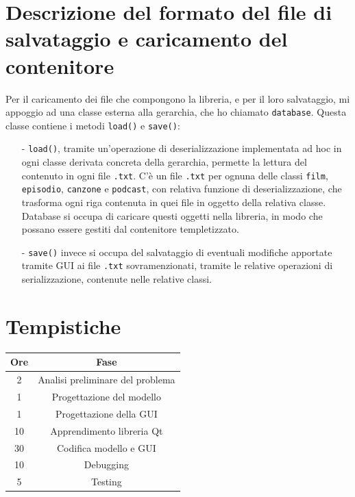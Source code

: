 \documentclass[a4paper,10pt]{article}
\begin{document}
\section{Descrizione del formato del file di salvataggio e caricamento del contenitore}
Per il caricamento dei file che compongono la libreria, e per il loro salvataggio, mi appoggio ad una classe esterna alla gerarchia, che ho chiamato \texttt{database}. Questa classe contiene i metodi \texttt{load()} e \texttt{save()}: 
\begin{enumerate}
\item[-] \texttt{load()}, tramite un'operazione di deserializzazione implementata ad hoc in ogni classe derivata concreta della gerarchia, permette la lettura del contenuto in ogni file \texttt{.txt}. C'è un file \texttt{.txt} per ognuna delle classi \texttt{film}, \texttt{episodio}, \texttt{canzone} e \texttt{podcast}, con relativa funzione di deserializzazione, che trasforma ogni riga contenuta in quei file in oggetto della relativa classe. Database si occupa di caricare questi oggetti nella libreria, in modo che possano essere gestiti dal contenitore templetizzato.
\item[-] \texttt{save()} invece si occupa del salvataggio di eventuali modifiche apportate tramite GUI ai file \texttt{.txt} sovramenzionati, tramite le relative operazioni di serializzazione, contenute nelle relative classi. 
\end{enumerate}

\section{Tempistiche}

\begin{center}
 \begin{tabular}{||c | c ||} 
 \hline
 \textbf{Ore} & \textbf{Fase}  \\ 
 \hline\hline
 2 & Analisi preliminare del problema \\ 
 \hline
 1 & Progettazione del modello \\
 \hline
 1 & Progettazione della GUI\\
 \hline
 10 & Apprendimento libreria Qt \\
 \hline
 30 & Codifica modello e GUI\\ 
 \hline
 10 & Debugging \\
 \hline
 5 & Testing\\
 \hline
\end{tabular}
\end{center}
\end{document}

